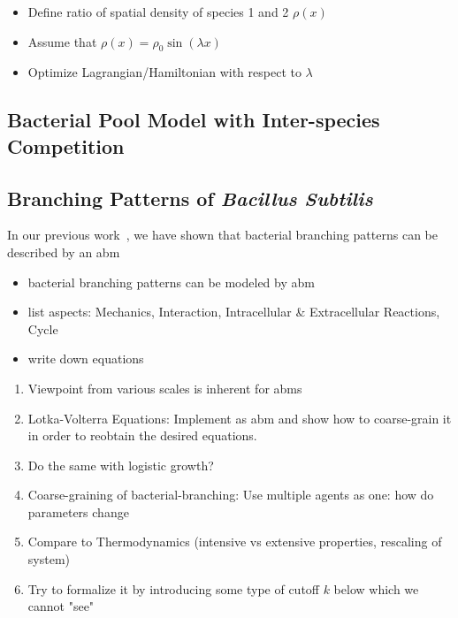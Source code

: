 \begin{itemize}
    \item Define ratio of spatial density of species 1 and 2 $\rho(x)$
    \item Assume that $\rho(x) = \rho_0\sin(\lambda x)$
    \item Optimize Lagrangian/Hamiltonian with respect to $\lambda$
\end{itemize}

\subsection{Bacterial Pool Model with Inter-species Competition}

\subsection{Branching Patterns of \textit{Bacillus Subtilis}}

In our previous work~\cite{Pleyer2025}, we have shown that bacterial branching patterns can be
described by an \ac{abm}

\begin{itemize}
    \item bacterial branching patterns can be modeled by \ac{abm}
    \item list aspects: Mechanics, Interaction, Intracellular \& Extracellular Reactions, Cycle
    \item write down equations
\end{itemize}

\begin{enumerate}
    \item Viewpoint from various scales is inherent for \acp{abm}
    \item Lotka-Volterra Equations: Implement as \ac{abm} and show how to coarse-grain it in order
        to reobtain the desired equations.
    \item Do the same with logistic growth?
    \item Coarse-graining of bacterial-branching: Use multiple agents as one: how do parameters
        change
    \item Compare to Thermodynamics (intensive vs extensive properties, rescaling of system)
    \item Try to formalize it by introducing some type of cutoff $k$ below which we cannot "see"
\end{enumerate}

